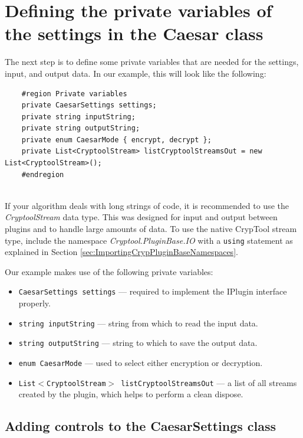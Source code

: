 \section{Defining the private variables of the settings in the Caesar class}
\label{sec:DefiningThePrivateVariablesOfTheSettingsInTheCaesarClass}

The next step is to define some private variables that are needed for the settings, input, and output data. In our example, this will look like the following:

\begin{lstlisting}
	#region Private variables
	private CaesarSettings settings;
	private string inputString;
	private string outputString;
	private enum CaesarMode { encrypt, decrypt };
	private List<CryptoolStream> listCryptoolStreamsOut = new List<CryptoolStream>();
	#endregion
\end{lstlisting}

\ \\ %
If your algorithm deals with long strings of code, it is recommended to use the \textit{CryptoolStream} data type. This was designed for input and output between plugins and to handle large amounts of data. To use the native CrypTool stream type, include the namespace \textit{Cryptool.PluginBase.IO} with a \texttt{using} statement as explained in Section \ref{sec:ImportingCrypPluginBaseNamespaces}.

Our example makes use of the following private variables:

\begin{itemize}
	\item \texttt{CaesarSettings settings} --- required to implement the IPlugin interface properly.
	\item \texttt{string inputString} --- string from which to read the input data.
	\item \texttt{string outputString} --- string to which to save the output data.
	\item \texttt{enum CaesarMode} --- used to select either encryption or decryption.
	\item \texttt{List$<$CryptoolStream$>$ listCryptoolStreamsOut} --- a list of all streams created by the plugin, which helps to perform a clean dispose.
\end{itemize}

\subsection{Adding controls to the CaesarSettings class}
\label{sec:AddingControlsToTheCaesarSettingsClass}

